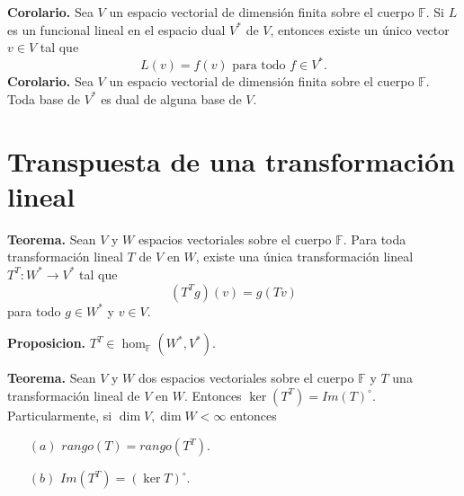 \newpage

\textbf{Corolario.} Sea $V$ un espacio vectorial de dimensión
finita sobre el cuerpo $\mathbb{F}$. Si $L$ es un funcional
lineal en el espacio dual $V^{\ast}$ de $V$, entonces existe
un único vector $v\in V$ tal que $$L(v) = f(v)\text{ para todo }f\in V^{\ast}.$$
\textbf{Corolario.} Sea $V$ un espacio vectorial de dimensión
finita sobre el cuerpo $\mathbb{F}$. Toda base de $V^{\ast}$
es dual de alguna base de $V$.

\section{Transpuesta de una transformación lineal}

\textbf{Teorema.} Sean $V$ y $W$ espacios vectoriales
sobre el cuerpo $\mathbb{F}$. Para toda transformación
lineal $T$ de $V$ en $W$, existe una única transformación
lineal  $T^{T}:W^{\ast}\to V^{\ast}$ tal que $$(T^{T}g)(v)
= g(Tv)$$ para todo $g\in W^{\ast}$ y
$v\in V$.


\textbf{Proposicion.} $T^{T}\in \hom_{\mathbb{F}}(W^{\ast}
,V^{\ast})$.



\textbf{Teorema.} Sean $V$ y $W$  dos espacios vectoriales
sobre el cuerpo $\mathbb{F}$ y $T$ una transformación lineal
de $V$ en $W$. Entonces $\ker(T^{T})=Im(T)^{\circ}$.
Particularmente, si $\dim V, \dim W < \infty$ entonces
\begin{itemize}
    \item[$(a)$] $rango(T)=rango(T^{T})$.
    \item[$(b)$] $Im(T^{T})=(\ker T)^{\circ}$.
\end{itemize}

